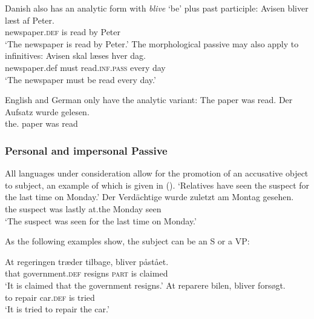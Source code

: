Danish also has an analytic form with \emph{blive} `be' plus past participle: 
\ea
\gll Avisen                 bliver læst af Peter.\\
     newspaper.\textsc{def} is     read by Peter\\\danish
\glt `The newspaper is read by Peter.'
\z
The morphological passive may also apply to infinitives:
\ea
\gll Avisen skal læses hver dag.\\
     newspaper.def must read.\textsc{inf}.\textsc{pass} every day\\\danish
\glt `The newspaper must be read every day.'
\z


English and German only have the analytic variant:
\eal
\ex The paper was read.
\ex 
\gll Der Aufsatz wurde gelesen.\\
     the.\NOM{} paper was read\\\german
\zl    





\subsubsection{Personal and impersonal Passive}
\label{sec-impersonal-passive-phen}

All languages under consideration allow for the promotion of an accusative object to subject, an
example of which is given in ().
\eal
\ex
{}
\glt `Relatives have seen the suspect for the last time on Monday.'
\ex 
\gll Der Verdächtige wurde zuletzt am Montag gesehen.\\
     the\NOM{} suspect     was   lastly at.the Monday seen\\
\glt `The suspect was seen for the last time on Monday.'
\zl

\noindent
As the following examples show, the subject can be an S or a VP:

\eal
\ex
\gll At regeringen træder tilbage, bliver påstået.\\
     that government.\textsc{def} resigns \textsc{part} is claimed\\\danish
\glt `It is claimed that the government resigns.'
\ex
\gll At reparere bilen, bliver forsøgt.\\
     to repair car.\textsc{def} is tried\\
\glt `It is tried to repair the car.'
\zl


